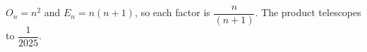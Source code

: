 $O_n=n^2$ and $E_n=n(n+1)$, so each factor is $\dfrac{n}{(n+1)}$. The product telescopes to $\boxed{\dfrac{1}{2025}}$.
